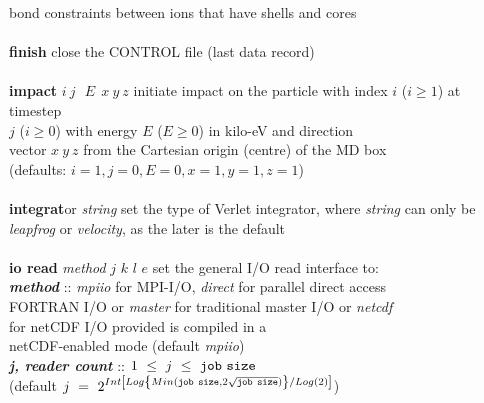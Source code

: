 \begin{tabbing}
\>                                              \> bond constraints between ions that have shells and cores \\
\>                                              \> \\
\> {\bf finish}                                 \> close the CONTROL file (last data record) \\
\>                                              \> \\
\> {\bf impact} $i~j~~~E~~x~y~z$                \> initiate impact on the particle with index $i$ ($i \ge 1$) at timestep \\
\>                                              \> $j$ ($i \ge 0$) with energy $E$ ($E \ge 0$) in kilo-eV and direction \\
\>                                              \> vector $x~y~z$ from the Cartesian origin (centre) of the MD box \\
\>                                              \> (defaults: $i = 1, j = 0, E = 0, x = 1, y = 1, z = 1$) \\
\>                                              \> \\
\> {\bf integrat}or {\em string}                \> set the type of Verlet integrator, where {\em string} can only be \\
\>                                              \> {\em leapfrog} or {\em velocity}, as the later is the default \\
\>                                              \> \\
\> {\bf io read} {\em method}  $j$ $k$ $l$ $e$  \> set the general I/O read interface to: \\
\>                                              \> {\bf \em method} :: {\em mpiio} for MPI-I/O, {\em direct} for parallel direct access \\
\>                                              \> \phantom{x} FORTRAN I/O or {\em master} for traditional master I/O or {\em netcdf} \\
\>                                              \> \phantom{x} for netCDF I/O provided \D is compiled in a \\
\>                                              \> \phantom{x} netCDF-enabled mode (default {\em mpiio}) \\
\>                                              \> \phantom{xxx} {\bf \em j, reader count} :: $1~\le~j~\le~{\tt job~size}$ \\
\>                                              \> \phantom{xxxx} (default $j~=~2^{Int\left[Log\left\{Min({\tt job~size},2\sqrt{\tt job~size})\right\}/Log(2)\right]}$) \\

\end{tabbing}
